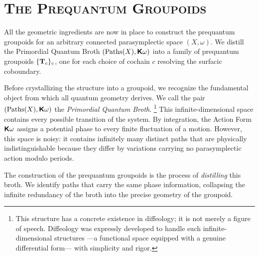 \documentclass[11pt,reqno,letterpaper,twoside]{amsart}
\begin{document}
  \section{\textsc{\textbf{The Prequantum Groupoids}}}
  \label{sec:PrequantumGroupoid}
  
  All the geometric ingredients are now in place to construct the prequantum groupoids for an arbitrary connected parasymplectic space $(X, \omega)$.
  We distill the Primordial Quantum Broth $(\operatorname{Paths}(X), \boldsymbol{\mathsf{K}}\omega)$ into a family of prequantum groupoids $\{\mathbf{T}_c\}_c$,
  one for each choice of cochain $c$ resolving the surfacic coboundary.
  
  \begin{article}
    \label{art:The Quantum Broth}
    
    Before crystallizing the structure into a groupoid,
    we recognize the fundamental object from which all quantum geometry derives.
    We call the pair $(\operatorname{Paths}(X), \boldsymbol{\mathsf{K}}\omega)$ the \emph{Primordial Quantum Broth}.%
    \footnote{This structure has a concrete existence in diffeology;
    it is not merely a figure of speech.
    Diffeology was expressly developed to handle such infinite-dimensional structures
    ---a functional space equipped with a genuine differential form---
    with simplicity and rigor.}
    This infinite-dimensional space contains every possible transition of the system.
    By integration,
    the Action Form $\boldsymbol{\mathsf{K}}\omega$ assigns a potential phase to every finite fluctuation of a motion.
    However,
    this space is noisy:
    it contains infinitely many distinct paths that are physically indistinguishable because they differ by variations carrying no parasymplectic action modulo periods.
    
    The construction of the prequantum groupoids is the process of \emph{distilling} this broth.
    We identify paths that carry the same phase information,
    collapsing the infinite redundancy of the broth into the precise geometry of the groupoid.
  \end{article}
  
\end{document}
